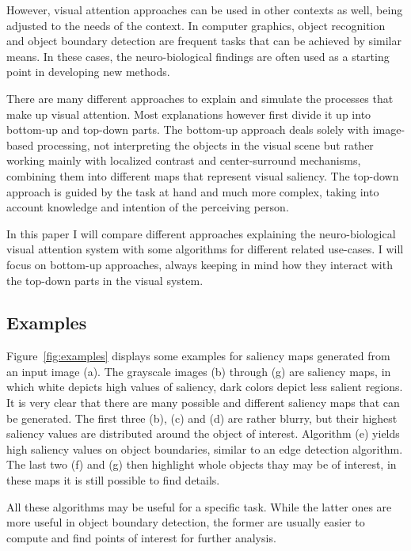 \documentclass[a4paper,12pt,fleqn,oneside]{scrartcl}
\begin{document}
However, visual attention approaches can be used in other contexts as well, being adjusted to the  needs of the context.
In computer graphics, object recognition and object boundary detection are frequent tasks that can be achieved by
similar means. In these cases, the neuro-biological findings are often used as a starting point in developing new methods.

There are many different approaches to explain and simulate the processes that make up visual attention. Most
explanations however first divide it up into bottom-up and top-down parts. The bottom-up approach deals solely with
image-based processing, not interpreting the objects in the visual scene but rather working mainly with localized
contrast and center-surround mechanisms, combining them into different maps that represent visual saliency. The top-down
approach is guided by the task at hand and much more complex, taking into account knowledge and intention of the
perceiving person.

In this paper I will compare different approaches explaining the neuro-biological visual  attention system with some
algorithms for different related use-cases. I will focus on bottom-up approaches, always keeping in mind how they
interact with the top-down parts in the visual system.

\subsection{Examples}

Figure~\ref{fig:examples} displays some examples for saliency maps generated from an input image (a). The grayscale
images (b) through (g) are saliency maps, in which white depicts high values of saliency, dark colors depict less
salient regions. It is very clear that there are many possible and different saliency maps that can be generated. The
first three (b), (c) and (d) are rather blurry, but their highest saliency values are distributed around the object of
interest. Algorithm (e) yields high saliency values on object boundaries, similar to an edge detection algorithm. The
last two (f) and (g) then highlight whole objects thay may be of interest, in these maps  it is still possible to find
details.

All these algorithms may be useful for a specific task. While the latter ones are more useful in object boundary
detection, the former are usually easier to compute and find points of interest for further analysis.
\end{document}
